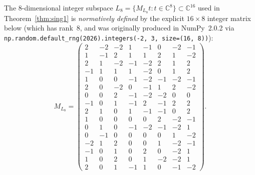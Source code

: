 \documentclass[11pt,a4paper]{article}
\theoremstyle{definition}
\begin{document}
The $8$-dimensional integer subspace $L_8 = \{M_{L_8} t : t \in \mathbb{C}^8\} \subset \mathbb{C}^{16}$ used in Theorem~\ref{thm:sing1} is \emph{normatively defined} by the explicit $16 \times 8$ integer matrix below (which has rank~$8$, and was originally produced in NumPy~2.0.2 via \texttt{np.random.default\_rng(2026).integers(-2, 3, size=(16, 8))}):
\[
  M_{L_8} = \begin{pmatrix}
   2 & -2 & -2 &  1 & -1 &  0 & -2 & -1 \\
   1 & -1 &  2 &  1 &  1 &  2 &  1 & -2 \\
   2 &  1 & -2 & -1 & -2 &  2 &  1 &  2 \\
  -1 &  1 &  1 &  1 & -2 &  0 &  1 &  2 \\
   1 &  0 &  0 & -1 & -2 & -1 & -2 & -1 \\
   2 &  0 & -2 &  0 & -1 &  1 &  2 & -2 \\
   0 &  0 &  2 & -1 & -2 & -2 &  0 &  0 \\
  -1 &  0 &  1 & -1 &  2 & -1 &  2 &  2 \\
   2 &  1 &  0 &  1 & -1 & -1 &  0 &  2 \\
   1 &  0 &  0 &  0 &  0 &  2 & -2 & -1 \\
   0 &  1 &  0 & -1 & -2 & -1 & -2 &  1 \\
   0 & -1 &  0 &  0 &  0 &  0 &  1 & -2 \\
  -2 &  1 &  2 &  0 &  0 &  1 & -2 & -1 \\
  -1 &  0 &  1 &  0 &  2 &  0 & -2 &  1 \\
   1 &  0 &  2 &  0 &  1 & -2 & -2 &  1 \\
   2 &  0 &  1 & -1 &  1 &  0 & -1 & -2
  \end{pmatrix}.
\]
\end{document}
